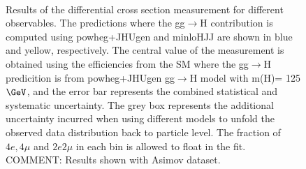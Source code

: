\begin{figure}[!h!t]
\begin{center}
{    } \\
    \caption{Results of the differential cross section measurement for different observables. The predictions where the gg$\rightarrow$H contribution is computed using {\sc powheg+JHUgen} and {\sc minloHJJ} are shown in blue and yellow, respectively. The central value of the measurement is obtained using the efficiencies from the SM where the gg$\rightarrow$H predicition is from {\sc powheg+JHUgen} gg$\rightarrow$H model with m(H)= 125 $\GeV$, and the error bar represents the combined statistical and systematic uncertainty. The grey box represents the additional uncertainty incurred when using different models to unfold the observed data distribution back to particle level. The fraction of $4e,4\mu$ and $2e2\mu$ in each bin is allowed to float in the fit.
    COMMENT: Results shown with Asimov dataset.
    }
  \label{fig:differential-results-asimov-2}
 \end{center}
\end{figure}

